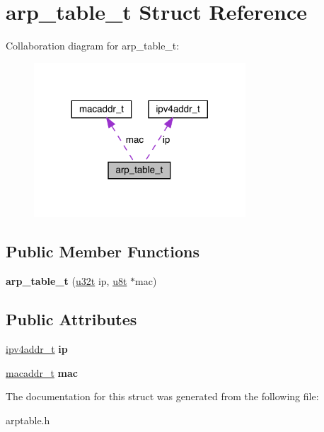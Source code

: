 \hypertarget{structarp__table__t}{}\section{arp\+\_\+table\+\_\+t Struct Reference}
\label{structarp__table__t}


Collaboration diagram for arp\+\_\+table\+\_\+t\+:\nopagebreak
\begin{figure}[H]
\begin{center}
\leavevmode
\includegraphics[width=224pt]{structarp__table__t__coll__graph}
\end{center}
\end{figure}
\subsection*{Public Member Functions}
\begin{DoxyCompactItemize}
\item 
\mbox{\label{structarp__table__t_a55dbe4612e966b60efa8324e185922dc}} 
{\bfseries arp\+\_\+table\+\_\+t} (\hyperlink{macros_8h_a464a07ed2c6d005d677113cc44750a64}{u32t} ip, \hyperlink{macros_8h_a176a4ab0531a048e0693a4520c550193}{u8t} $\ast$mac)
\end{DoxyCompactItemize}
\subsection*{Public Attributes}
\begin{DoxyCompactItemize}
\item 
\mbox{\label{structarp__table__t_ac52ee8bea2f590d4bc914c63a308e41e}} 
\hyperlink{unionipv4addr__t}{ipv4addr\+\_\+t} {\bfseries ip}
\item 
\mbox{\label{structarp__table__t_aa43555ba4be02b3ce8ff25269ef346f0}} 
\hyperlink{structmacaddr__t}{macaddr\+\_\+t} {\bfseries mac}
\end{DoxyCompactItemize}


The documentation for this struct was generated from the following file\+:\begin{DoxyCompactItemize}
\item 
arptable.\+h\end{DoxyCompactItemize}
